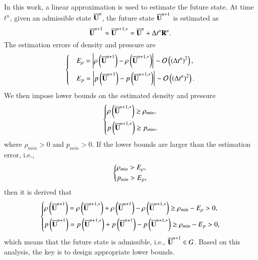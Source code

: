 In this work, a linear approximation is used to estimate the future state. At time $t^n$, given an admissible state $\overline{\mathbf{U}}^n$, the future state $\overline{\mathbf{U}}^{n+1}$ is estimated as
\begin{equation}
\label{eq:linear-approximation}
    \overline{\mathbf{U}}^{n+1} \approx \overline{\mathbf{U}}^{n+1,*}=\overline{\mathbf{U}}^n + \mathrm\Delta t^n \mathbf{R}^n.
\end{equation}
The estimation errors of density and pressure are
\begin{equation}
    \begin{dcases}
        &E_{\rho} = \left|\rho\left(\overline{\mathbf{U}}^{n+1}\right) - \rho\left(\overline{\mathbf{U}}^{n+1,*}\right)\right|  \sim \mathcal{O} \left(\left(\mathrm\Delta t^n\right)^2\right), \\
        &E_{p} = \left|p\left(\overline{\mathbf{U}}^{n+1}\right) - p\left(\overline{\mathbf{U}}^{n+1,*}\right)\right|  \sim \mathcal{O} \left(\left(\mathrm\Delta t^n\right)^2\right).
    \end{dcases}
\end{equation}
We then impose lower bounds on the estimated density and pressure
\begin{equation}
\begin{dcases}
\label{eq:impose-lower-bounds}
    \rho\left(\overline{\mathbf{U}}^{n+1,*}\right) \geq \rho_{min}, \\
    p\left(\overline{\mathbf{U}}^{n+1,*}\right) \geq p_{min},
\end{dcases}
\end{equation}
where $\rho_{min}>0$ and $p_{min}>0$. If the lower bounds are larger than the estimation error, i.e.,
\begin{equation}
    \begin{dcases}
        \rho_{min} > E_\rho, \\
        p_{min} > E_p,
    \end{dcases}
\end{equation}
then it is derived that
\begin{equation}
    \begin{dcases}
        \rho\left(\overline{\mathbf{U}}^{n+1}\right) = \rho\left(\overline{\mathbf{U}}^{n+1,*}\right) + \rho\left(\overline{\mathbf{U}}^{n+1}\right) - \rho\left(\overline{\mathbf{U}}^{n+1,*}\right) \geq \rho_{min} - E_\rho>0, \\
        p\left(\overline{\mathbf{U}}^{n+1}\right) = p\left(\overline{\mathbf{U}}^{n+1,*}\right) + p\left(\overline{\mathbf{U}}^{n+1}\right) - p\left(\overline{\mathbf{U}}^{n+1,*}\right) \geq \rho_{min} - E_p>0,
    \end{dcases}
\end{equation}
which means that the future state is admissible, i.e., $\overline{\mathbf{U}}^{n+1} \in G$. Based on this analysis, the key is to design appropriate lower bounds. 

